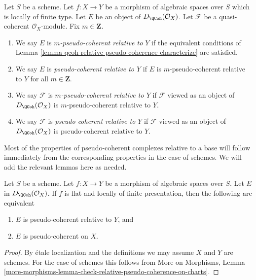 \begin{definition}
\label{definition-relative-pseudo-coherence}
Let $S$ be a scheme. Let $f : X \to Y$ be a morphism of
algebraic spaces over $S$ which is locally of finite type.
Let $E$ be an object of $D_\QCoh(\mathcal{O}_X)$. Let $\mathcal{F}$ be a
quasi-coherent $\mathcal{O}_X$-module. Fix $m \in \mathbf{Z}$.
\begin{enumerate}
\item We say $E$ is {\it $m$-pseudo-coherent relative to $Y$}
if the equivalent conditions of
Lemma \ref{lemma-qcoh-relative-pseudo-coherence-characterize} are satisfied.
\item We say $E$ is {\it pseudo-coherent relative to $Y$}
if $E$ is $m$-pseudo-coherent relative to $Y$ for all $m \in \mathbf{Z}$.
\item We say $\mathcal{F}$ is {\it $m$-pseudo-coherent relative to $Y$} if
$\mathcal{F}$ viewed as an object of $D_\QCoh(\mathcal{O}_X)$ is
$m$-pseudo-coherent relative to $Y$.
\item We say $\mathcal{F}$ is {\it pseudo-coherent relative to $Y$} if
$\mathcal{F}$ viewed as an object of $D_\QCoh(\mathcal{O}_X)$ is
pseudo-coherent relative to $Y$.
\end{enumerate}
\end{definition}

\noindent
Most of the properties of pseudo-coherent complexes relative to a base
will follow immediately from the corresponding properties in the case
of schemes. We will add the relevant lemmas here as needed.

\begin{lemma}
\label{lemma-relative-pseudo-coherent-is-moot}
Let $S$ be a scheme. Let $f : X \to Y$ be a morphism of
algebraic spaces over $S$. Let $E$ in $D_\QCoh(\mathcal{O}_X)$.
If $f$ is flat and locally of finite presentation, then
the following are equivalent
\begin{enumerate}
\item $E$ is pseudo-coherent relative to $Y$, and
\item $E$ is pseudo-coherent on $X$.
\end{enumerate}
\end{lemma}

\begin{proof}
By \'etale localization and the definitions we may assume
$X$ and $Y$ are schemes. For the case of schemes this follows
from More on Morphisms, Lemma
\ref{more-morphisms-lemma-check-relative-pseudo-coherence-on-charts}.
\end{proof}

















